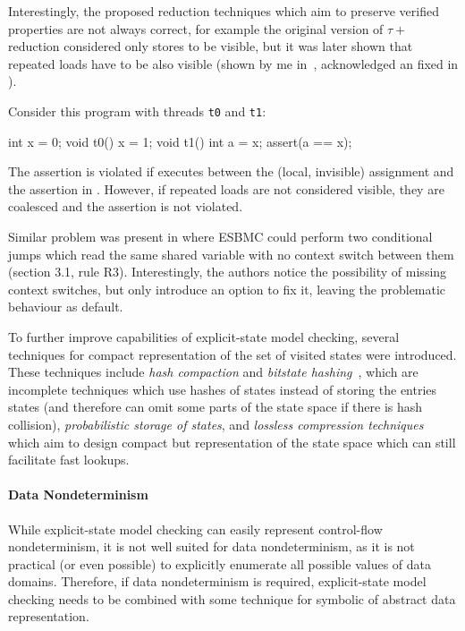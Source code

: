 Interestingly, the proposed reduction techniques which aim to preserve verified properties are not always correct, for example the original version of $\tau+$ reduction considered only stores to be visible, but it was later shown that repeated loads have to be also visible (shown by me in~\cite{S2016}, acknowledged an fixed in \cite[Section 6]{RSCB2018}).\begin{marginnote}%
Consider this program with threads \texttt{t0} and \texttt{t1}:

\begin{cppcode}
  int x = 0;
  void t0() {
    x = 1;
  }
  void t1() {
    int a = x;
    assert(a == x);
  }
\end{cppcode}

The assertion is violated if  executes between the (local, invisible)
assignment and the assertion in .
However, if repeated loads are not considered visible, they are coalesced and
the assertion is not violated.
\end{marginnote}
Similar problem was present in \cite{Cordeiro2011} where ESBMC could perform two conditional jumps which read the same shared variable with no context switch between them (section 3.1, rule R3).
Interestingly, the authors notice the possibility of missing context switches, but only introduce an option to fix it, leaving the problematic behaviour as default.

To further improve capabilities of explicit-state model checking, several
techniques for compact representation of the set of visited states were
introduced.
These techniques include \emph{hash compaction} and \emph{bitstate
hashing}~\cite{Holzmann1998}, which are incomplete techniques which use hashes
of states instead of storing the entries states (and therefore can omit some
parts of the state space if there is hash collision),
\emph{probabilistic storage of states}, and
\emph{lossless compression techniques}~\cite{RSB15TC,Laarman2019} which aim to design compact but representation of the state space which can still facilitate fast lookups.

\paragraph{Data Nondeterminism}
While explicit-state model checking can easily represent control-flow
nondeterminism, it is not well suited for data nondeterminism, as it is not
practical (or even possible) to explicitly enumerate all possible values of
data domains.
Therefore, if data nondeterminism is required, explicit-state model checking
needs to be combined with some technique for symbolic of abstract data
representation.

